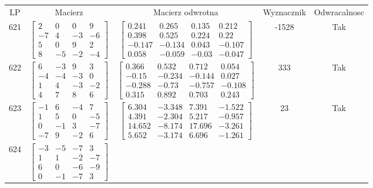 \documentclass[a4paper,12pt]{article}
\begin{document}
\bgroup {} \vspace{0.2in} \begin{tabular}{c c c c c}
LP & Macierz & Macierz odwrotna & Wyznacznik & Odwracalnosc\\
621
&
$\begin{bmatrix} 2 & 0 & 0 & 9 \\ -7 & 4 & -3 & -6 \\ 5 & 0 & 9 & 2 \\ 8 & -5 & -2 & -4 \end{bmatrix}$
&
$\begin{bmatrix} 0.241 & 0.265 & 0.135 & 0.212 \\ 0.398 & 0.525 & 0.224 & 0.22 \\ -0.147 & -0.134 & 0.043 & -0.107 \\ 0.058 & -0.059 & -0.03 & -0.047 \end{bmatrix}$
&
-1528
&
Tak
\\
622
&
$\begin{bmatrix} 6 & -3 & 9 & 3 \\ -4 & -4 & -3 & 0 \\ 1 & 4 & -3 & -2 \\ 4 & 7 & 8 & 6 \end{bmatrix}$
&
$\begin{bmatrix} 0.366 & 0.532 & 0.712 & 0.054 \\ -0.15 & -0.234 & -0.144 & 0.027 \\ -0.288 & -0.73 & -0.757 & -0.108 \\ 0.315 & 0.892 & 0.703 & 0.243 \end{bmatrix}$
&
333
&
Tak
\\
623
&
$\begin{bmatrix} -1 & 6 & -4 & 7 \\ 1 & 5 & 0 & -5 \\ 0 & -1 & 3 & -7 \\ -7 & 9 & -2 & 6 \end{bmatrix}$
&
$\begin{bmatrix} 6.304 & -3.348 & 7.391 & -1.522 \\ 4.391 & -2.304 & 5.217 & -0.957 \\ 14.652 & -8.174 & 17.696 & -3.261 \\ 5.652 & -3.174 & 6.696 & -1.261 \end{bmatrix}$
&
23
&
Tak
\\
624
&
$\begin{bmatrix} -3 & -5 & -7 & 3 \\ 1 & 1 & -2 & -7 \\ 6 & 0 & -6 & -9 \\ 0 & -1 & -7 & 3 \end{bmatrix}$

\end{tabular}
\end{document}
